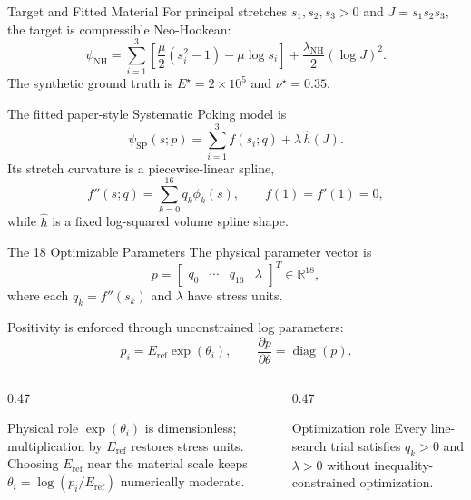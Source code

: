 \documentclass[aspectratio=169,10pt]{beamer}
\newcommand{\eref}{E_{\mathrm{ref}}}
\begin{document}
\begin{frame}{Target and Fitted Material}
  \small
  For principal stretches $s_1,s_2,s_3>0$ and $J=s_1s_2s_3$, the target is
  compressible Neo-Hookean:
  \[
    \psi_{\mathrm{NH}}
    =
    \sum_{i=1}^{3}
    \left[
      \frac{\mu}{2}(s_i^2-1)-\mu\log s_i
    \right]
    +\frac{\lambda_{\mathrm{NH}}}{2}(\log J)^2.
  \]
  The synthetic ground truth is
  $E^\star=2\times10^5$ and $\nu^\star=0.35$.

  \vspace{0.5em}
  The fitted paper-style Systematic Poking model is
  \[
    \boxed{
      \psi_{\mathrm{SP}}(s;p)
      =\sum_{i=1}^{3}f(s_i;q)+\lambda\,\widehat h(J)
    }.
  \]
  Its stretch curvature is a piecewise-linear spline,
  \[
    f''(s;q)=\sum_{k=0}^{16}q_k\phi_k(s),
    \qquad f(1)=f'(1)=0,
  \]
  while $\widehat h$ is a fixed log-squared volume spline shape.
\end{frame}

\begin{frame}{The 18 Optimizable Parameters}
  \small
  The physical parameter vector is
  \[
    p=
    \begin{bmatrix}q_0&\cdots&q_{16}&\lambda\end{bmatrix}^{T}
    \in\mathbb R^{18},
  \]
  where each $q_k=f''(s_k)$ and $\lambda$ have stress units.

  Positivity is enforced through unconstrained log parameters:
  \[
    \boxed{p_i=\eref\exp(\theta_i)},
    \qquad
    \frac{\partial p}{\partial\theta}=\operatorname{diag}(p).
  \]

  \begin{columns}[T,onlytextwidth]
    \begin{column}{0.47\linewidth}
      \begin{block}{Physical role}
        $\exp(\theta_i)$ is dimensionless; multiplication by $\eref$ restores
        stress units. Choosing $\eref$ near the material scale keeps
        $\theta_i=\log(p_i/\eref)$ numerically moderate.
      \end{block}
    \end{column}
    \begin{column}{0.47\linewidth}
      \begin{block}{Optimization role}
        Every line-search trial satisfies $q_k>0$ and $\lambda>0$ without
        inequality-constrained optimization.
      \end{block}
    \end{column}
  \end{columns}
\end{frame}
\end{document}
